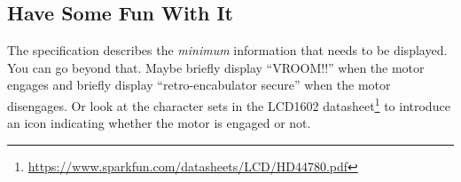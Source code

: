 \subsection{Have Some Fun With It}

The specification describes the \textit{minimum} information that needs to be displayed.
You can go beyond that.
Maybe briefly display ``VROOM!!'' when the motor engages and briefly display ``retro-encabulator secure'' when the motor disengages.
Or look at the character sets in the LCD1602 datasheet\footnote{
    \url{https://www.sparkfun.com/datasheets/LCD/HD44780.pdf}
} to introduce an icon indicating whether the motor is engaged or not.
